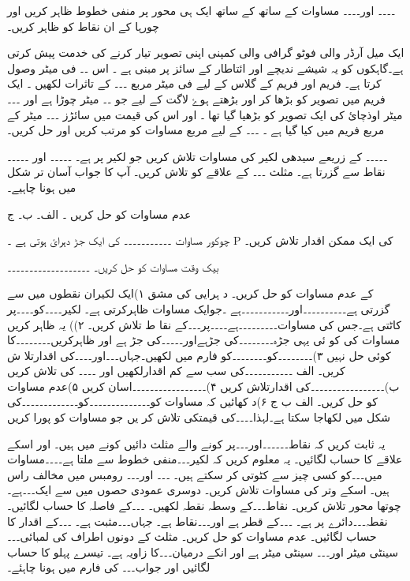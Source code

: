 ۔۔۔۔ اور۔۔۔۔ مساوات کے ساتھ کے ساتھ ایک ہی محور پر منفی خطوط ظاہر کریں اور چورہا کے ان نقاط کو ظاہر کریں۔


ایک میل آرڈر والی فوٹو گرافی والی کمپنی اپنی تصویر تیار کرنے کی خدمت پیش کرتی ہے۔گاہکوں کو یہ شیشے ندیچے اور ائتاطار کے سائز پر مبنی ہے ۔ اس ۔۔ فی میٹر وصول کرتا ہے۔ فریم اور فریم کے گلاس کے لیے فی میٹر مربع ۔۔۔ کے تاثرات لکھیں ۔ ایک فریم میں تصویر کو بڑھا کر اور بڑھتے ہوۓ لاگت کے لیے جو ۔۔ میٹر چوڑا ہے اور ۔۔۔ میٹر اوذچائ کی ایک تصویر کو بڑھیا گیا تھا ۔ اور اس کی قیمت میں سائڑز ۔۔۔ میٹر کے مربع فریم میں کیا گیا ہے ۔ ۔۔۔ کے لیے مربع مساوات کو مرتب کریں اور حل کریں۔

۔۔۔۔۔ کے زریعے سیدھی لکیر کی مساوات تلاش کریں جو لکیر پر ہے۔ ۔۔۔۔۔ اور ۔۔۔۔۔ نقاط سے گزرتا ہے۔ مثلث ۔۔۔ کے علاقے کو تلاش کریں۔ آپ کا جواب آسان تر شکل میں ہونا چاہیے۔

عدم مساوات کو حل کریں ۔
الف۔ ب۔ ج

چوکور مساوات ۔۔۔۔۔۔۔۔۔۔۔ کی ایک جڑ دہرائ ہوتی ہے ۔ P کی ایک ممکن اقدار تلاش کریں۔

بیک وقت مساوات کو حل کریں۔
۔۔۔۔۔۔۔۔۔۔۔۔۔۔۔۔۔۔۔

کے عدم مساوات کو حل کریں۔
د ہرایی کی مشق
۱)ایک لکیران نقطوں میں سے گزرتی ہے۔۔۔۔۔۔۔۔۔۔اور۔۔۔۔۔۔۔۔۔۔۔ہے ۔جوایک مساوات ظاہرکرتی ہے۔ لکیر۔۔۔۔کو۔۔۔۔پر کاٹتی ہے۔جس کی مساوات۔۔۔۔۔۔۔۔۔ہے۔۔۔۔پر۔۔۔کے نقا ط تلاش کریں۔
۲)) یہ ظاہر کریں مساوات کی کو ئی یہی جڑہ۔۔۔۔۔۔۔۔کی جڑہےاور۔۔۔۔۔کی جڑ ہے اور ظاہرکریں۔۔۔۔۔۔۔۔کا کوئی حل نہیں
۳)۔۔۔۔۔۔۔۔کو۔۔۔۔۔۔۔۔کو فارم میں لکھیں۔جہاں۔۔۔اور۔۔۔۔کی اقدارتلا ش کریں۔
 الف     ۔۔۔۔۔۔۔۔۔۔۔کی سب سے کم اقدارلکھیں اور ۔۔۔۔ کی تلاش کریں
ب)۔۔۔۔۔۔۔۔۔۔۔۔۔۔۔۔۔کی اقدارتلاش کریں
۴)۔۔۔۔۔۔۔۔۔۔۔۔۔۔۔۔۔اسان کریں
۵)عدم مساوات کو حل کریں۔
الف                         ب                       ج
۶)د کھائیں کہ مساوات کو۔۔۔۔۔۔۔۔۔۔۔۔۔۔کو۔۔۔۔۔۔۔۔۔۔۔۔۔کی شکل میں لکھاجا سکتا ہے۔لہذا۔۔۔۔کی قیمتکی تلاش کر یں جو مساوات کو پورا کریں


یہ ثابت کریں کہ نقاط۔۔۔۔۔۔اور۔۔۔پر کونے والے مثلث دائیں کونے میں ہیں۔ اور اسکے علاقے کا حساب لگائیں۔
یہ معلوم کریں کہ لکیر۔۔۔منفی خطوط سے ملتا ہے۔۔۔۔مساوات میں۔۔۔کو کسی چیز سے کٹوتی کر سکتے ہیں۔
۔۔۔ اور۔۔۔ رومبس میں مخالف راس ہیں۔ اسکے وتر کی مساوات تلاش کریں۔ دوسری عمودی حصوں میں سے ایک۔۔۔ہے۔ چوتھا محور تلاش کریں۔
نقاط۔۔۔کے وسطہ نقطہ لکھیں۔
۔۔۔کے فاصلہ کا حساب لگائیں۔
نقطہ۔۔۔دائرے پر ہے۔ ۔۔۔کے قطر ہے اور۔۔۔نقاط ہے۔ جہاں۔۔۔مثبت ہے۔ ۔۔۔کے اقدار کا حساب لگائیں۔
عدم مساوات کو حل کریں۔
مثلث کے دونوں اطراف کی لمبائی۔۔۔ سینٹی میٹر اور۔۔۔ سینٹی میٹر ہے اور انکے درمیان۔۔۔کا زاویہ ہے۔ تیسرے پہلو کا حساب لگائیں اور جواب۔۔۔ کی فارم میں ہونا چاہئے۔

